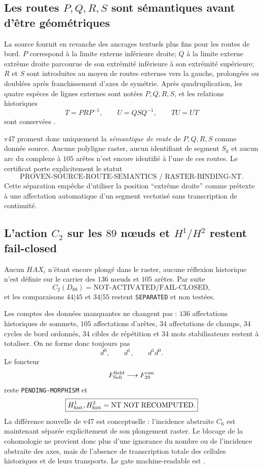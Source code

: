 \documentclass[11pt,a4paper]{article}
\newcommand{\certSeparated}{\texttt{SEPARATED}}
\newcommand{\certPending}{\texttt{PENDING-MORPHISM}}
\begin{document}
\subsection{Les routes $P,Q,R,S$ sont sémantiques avant d'être géométriques}

La source fournit en revanche des ancrages textuels plus fins pour les routes de bord. $P$ correspond à la limite externe inférieure droite; $Q$ à la limite externe extrême droite parcourue de son extrémité inférieure à son extrémité supérieure; $R$ et $S$ sont introduites au moyen de routes externes vers la gauche, prolongées ou doublées après franchissement d'axes de symétrie. Après quadruplication, les quatre espèces de lignes externes sont notées $P,Q,R,S$, et les relations historiques
\[
 T=PRP^{-1},\qquad U=QSQ^{-1},\qquad TU=UT
\]
sont conservées \cite{Selling1877}.

v47 promeut donc uniquement la \emph{sémantique de route} de $P,Q,R,S$ comme donnée source. Aucune polyligne raster, aucun identifiant de segment $S_k$ et aucun arc du complexe à $105$ arêtes n'est encore identifié à l'une de ces routes. Le certificat  porte explicitement le statut
\[
 \boxed{\text{PROVEN-SOURCE-ROUTE-SEMANTICS / RASTER-BINDING-NT}.}
\]
Cette séparation empêche d'utiliser la position ``extrême droite'' comme prétexte à une affectation automatique d'un segment vectorisé sans transcription de continuité.

\subsection{L'action $C_2$ sur les $89$ nœuds et $H^1/H^2$ restent fail-closed}

Aucun $HAX_i$ n'étant encore plongé dans le raster, aucune réflexion historique n'est définie sur le carrier des $136$ nœuds et $105$ arêtes. Par suite
\[
 \boxed{C_2(D_{89})=\text{NOT-ACTIVATED/FAIL-CLOSED}},
\]
et les comparaisons $44|45$ et $34|55$ restent \certSeparated{} et non testées.

Les comptes des données manquantes ne changent pas : $136$ affectations historiques de sommets, $105$ affectations d'arêtes, $34$ affectations de champs, $34$ cycles de bord ordonnés, $34$ cibles de répétition et $34$ mots stabilisateurs restent à totaliser. On ne forme donc toujours pas
\[
 d^0,\qquad d^1,\qquad d^1d^0.
\]
Le foncteur
\[
 F_{\rm Sell}^{\rm field}\longrightarrow F_{29}^{\rm can}
\]
reste \certPending{} et
\[
 \boxed{H^1_{\rm hist},H^2_{\rm hist}=\mathrm{NT\;NOT\;RECOMPUTED}.}
\]
La différence nouvelle de v47 est conceptuelle : l'incidence abstraite $C_6$ est maintenant séparée explicitement de son plongement raster. Le blocage de la cohomologie ne provient donc plus d'une ignorance du nombre ou de l'incidence abstraite des axes, mais de l'absence de transcription totale des cellules historiques et de leurs transports. Le gate machine-readable est .
\end{document}
